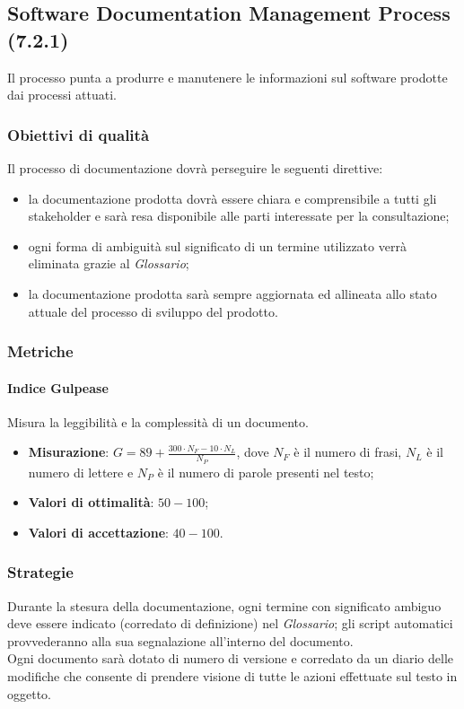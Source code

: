 \subsection{Software Documentation Management Process (7.2.1)}
\label{soDocMgmt}
Il processo punta a produrre e manutenere le informazioni sul software prodotte dai processi attuati.
\subsubsection{Obiettivi di qualità}
Il processo di documentazione dovrà perseguire le seguenti direttive:
\begin{itemize}
\item la documentazione prodotta dovrà essere chiara e comprensibile a tutti gli stakeholder e sarà resa disponibile alle parti interessate per la consultazione;
\item ogni forma di ambiguità sul significato di un termine utilizzato verrà eliminata grazie al \textit{Glossario};
\item la documentazione prodotta sarà sempre aggiornata ed allineata allo stato attuale del processo di sviluppo del prodotto.
\end{itemize}
\subsubsection{Metriche}
\paragraph{Indice Gulpease}
Misura la leggibilità e la complessità di un documento.
\begin{itemize}
\item \textbf{Misurazione}: $G = 89 + \frac{300\cdot{}N_{F}-10\cdot{}N_{L}}{N_{P}}$, dove $N_{F}$ è il numero di frasi, $N_{L}$ è il numero di lettere e $N_{P}$ è il numero di parole presenti nel testo;
\item \textbf{Valori di ottimalità}: $50 - 100$;
\item \textbf{Valori di accettazione}: $40 - 100$.
\end{itemize}
\subsubsection{Strategie}
Durante la stesura della documentazione, ogni termine con significato ambiguo deve essere indicato (corredato di definizione) nel \textit{Glossario}; gli script automatici provvederanno alla sua segnalazione all'interno del documento.\\
Ogni documento sarà dotato di numero di versione e corredato da un diario delle modifiche che consente di prendere visione di tutte le azioni effettuate sul testo in oggetto.
